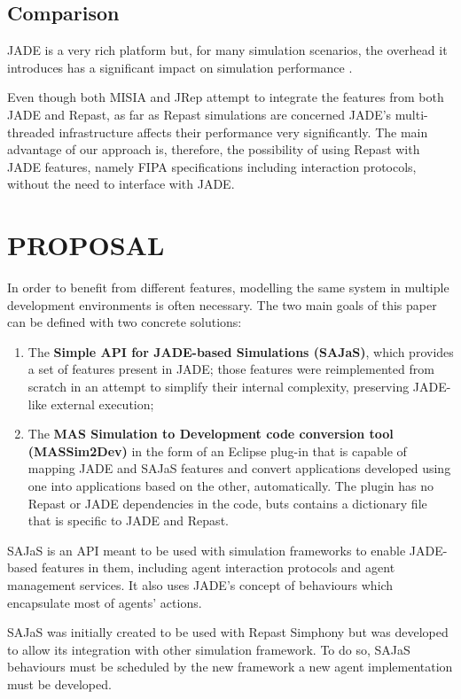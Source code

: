 \documentclass[a4paper,twoside]{article}
\begin{document}
\subsection{Comparison}

JADE is a very rich platform but, for many simulation scenarios, the overhead it introduces has a significant impact on simulation performance \cite{mengistu2008scalability}.

Even though both MISIA and JRep attempt to integrate the features from both JADE and Repast, as far as Repast simulations are concerned JADE's multi-threaded infrastructure affects their performance very significantly. The main advantage of our approach is, therefore, the possibility of using Repast with JADE features, namely FIPA specifications including interaction protocols, without the need to interface with JADE. 

\section{\uppercase{Proposal}}
\label{sec:Proposal}
\noindent In order to benefit from different features, modelling the same system in multiple development environments is often necessary. The two main goals of this paper can be defined with two concrete solutions:

\begin{enumerate}
  \item The \textbf{Simple API for JADE-based Simulations (SAJaS)}, which provides a set of features present in JADE; those features were reimplemented from scratch in an attempt to simplify their internal complexity, preserving JADE-like external execution;
  \item The \textbf{MAS Simulation to Development code conversion tool (MASSim2Dev)} in the form of an Eclipse plug-in that is capable of mapping JADE and SAJaS features and convert applications developed using one into applications based on the other, automatically. The plugin has no Repast or JADE dependencies in the code, buts contains a dictionary file that is specific to JADE and Repast.
\end{enumerate}

SAJaS is an API meant to be used with simulation frameworks to enable JADE-based features in them, including agent interaction protocols and agent management services. It also uses JADE's concept of behaviours which encapsulate most of agents' actions.

SAJaS was initially created to be used with Repast Simphony but was developed to allow its integration with other simulation framework. To do so, SAJaS behaviours must be scheduled by the new framework a new agent implementation must be developed.
\end{document}
